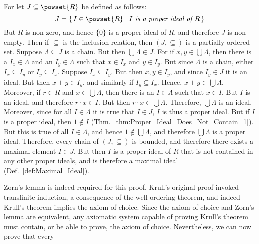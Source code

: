\documentclass{article}                                                        %
\begin{document}
        \begin{bproof}
            For let $J\subseteq\powset{R}$ be defined as follows:
            \begin{equation}
                J=\{\,I\in\powset{R}\;|\;I\textit{ is a proper ideal of }R\,\}
            \end{equation}
            But $R$ is non-zero, and hence $\{0\}$ is a proper ideal of $R$,
            and therefore $J$ is non-empty. Then if $\subseteq$ is the inclusion
            relation, then $(J,\subseteq)$ is a partially ordered set. Suppose
            $\Lambda\subseteq{J}$ is a chain. But then $\bigcup\Lambda\in{J}$.
            For if $x,y\in\bigcup\Lambda$, then there is a $I_{x}\in\Lambda$ and
            an $I_{y}\in\Lambda$ such that $x\in{I}_{x}$ and $y\in{I}_{y}$. But
            since $\Lambda$ is a chain, either $I_{x}\subseteq{I}_{y}$ or
            $I_{y}\subseteq{I}_{x}$. Suppose $I_{x}\subseteq{I}_{y}$. But then
            $x,y\in{I}_{y}$, and since $I_{y}\in{J}$ it is an ideal. But then
            $x+y\in{I}_{y}$, and similarly if $I_{y}\subseteq{I}_{x}$. Hence,
            $x+y\in\bigcup\Lambda$. Moreover, if $r\in{R}$ and
            $x\in\bigcup\Lambda$, then there is an $I\in\Lambda$ such that
            $x\in{I}$. But $I$ is an ideal, and therefore $r\cdot{x}\in{I}$.
            But then $r\cdot{x}\in\bigcup\Lambda$. Therefore, $\bigcup\Lambda$
            is an ideal. Moreover, since for all $I\in\Lambda$ it is true that
            $I\in{J}$, $I$ is thus a proper ideal. But if $I$ is a proper ideal,
            then $1\not\in{I}$ (Thm.~\ref{thm:Proper_Ideal_Does_Not_Contain_1}).
            But this is true of all $I\in\Lambda$, and hence
            $1\notin\bigcup\Lambda$, and therefore $\bigcup\Lambda$ is a proper
            ideal. Therefore, every chain of $(J,\subseteq)$ is bounded, and
            therefore there exists a maximal element $I\in{J}$. But then $I$
            is a proper ideal of $R$ that is not contained in any other proper
            ideals, and is therefore a maximal ideal
            (Def.~\ref{def:Maximal_Ideal}).
        \end{bproof}
        Zorn's lemma is indeed required for this proof. Krull's original proof
        invoked transfinite induction, a consequence of the well-ordering
        theorem, and indeed Krull's theorem implies the axiom of choice. Since
        the axiom of choice and Zorn's lemma are equivalent, any axiomatic
        system capable of proving Krull's theorem must contain, or be able to
        prove, the axiom of choice. Nevertheless, we can now prove that every
\end{document}
